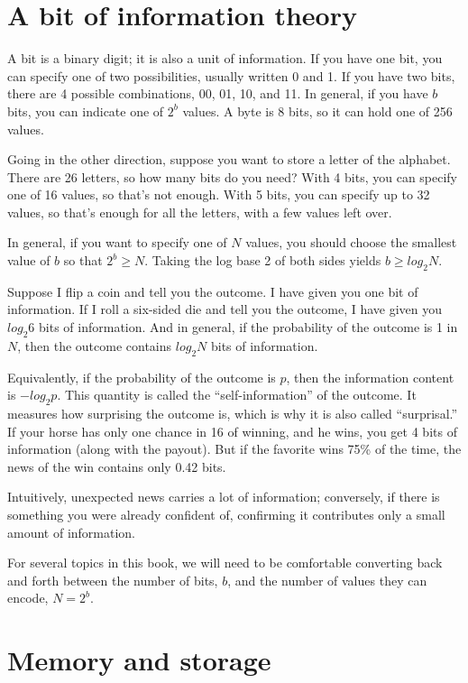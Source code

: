 \documentclass[12pt]{book}
\begin{document}
\section{A bit of information theory}

A bit is a binary digit; it is also a unit of information.  If you
have one bit, you can specify one of two possibilities, usually
written 0 and 1.  If you have two bits, there are 4 possible
combinations, 00, 01, 10, and 11.  In general, if you have $b$ bits, you
can indicate one of $2^b$ values.  A byte is 8 bits, so it can
hold one of 256 values.

Going in the other direction, suppose you want to store a letter
of the alphabet.  There are 26 letters, so how many bits do you
need?  With 4 bits, you can specify one of 16 values, so that's
not enough.  With 5 bits, you can specify up to 32 values, so
that's enough for all the letters, with a few values left over.

In general, if you want to specify one of $N$ values, you should
choose the smallest value of $b$ so that $2^b \ge N$.  Taking the
log base 2 of both sides yields $b \ge log_2 N$.

Suppose I flip a coin and tell you the outcome.  I have given
you one bit of information.  If I roll a six-sided die and tell
you the outcome, I have given you $log_2 6$ bits of information.
And in general, if the probability of the outcome is 1 in $N$,
then the outcome contains $log_2 N$ bits of information.

Equivalently, if the probability of the outcome is $p$, then
the information content is $-log_2 p$.  This quantity is called
the ``self-information'' of the outcome.  It measures
how surprising the outcome is, which is why it is also called
``surprisal.''  If your horse has only one chance in 16 of winning,
and he wins, you get 4 bits of information (along with the
payout).  But if the favorite wins 75\% of the time, the news
of the win contains only 0.42 bits.

Intuitively, unexpected news carries a lot of
information; conversely, if there is something you were already confident
of, confirming it contributes only a small amount of information.

For several topics in this book, we will need to be comfortable
converting back and forth between the number of bits, $b$, and the
number of values they can encode, $N = 2^b$.


\section{Memory and storage}
\end{document}
